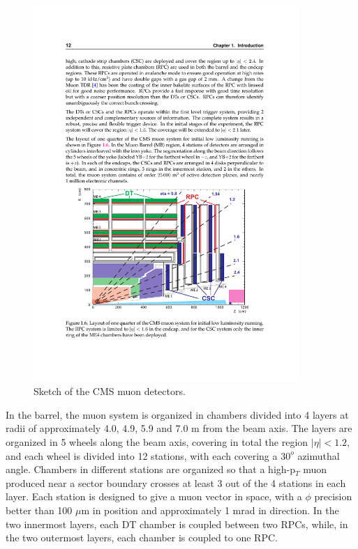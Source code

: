 \begin{figure}[h]
\centering 
\includegraphics[width=0.9\textwidth]{figures/cms_muon}\hfil
\caption{Sketch of the CMS muon detectors. }
\label{fig:cms_muon}
\end{figure}


In the barrel, the muon system is organized in chambers divided into 4 layers at radii of approximately 4.0, 4.9, 5.9 and 7.0 m from the beam axis. 
The layers are organized in 5 wheels along the beam axis, covering in total the region $|\eta| < 1.2$, and each wheel is divided into 12 stations, with each covering a $30^{o}$ azimuthal angle. 
Chambers in different stations are organized so that a high-p$_T$ muon produced near a sector boundary crosses at least 3 out of the 4 stations in each layer. 
Each station is designed to give a muon vector in space, with a $\phi$ precision better than 100 $\mu$m in position and approximately 1 mrad in direction. 
In the two innermost layers, each DT chamber is coupled between two RPCs, while, in the two outermost layers, each chamber is coupled to one RPC.

